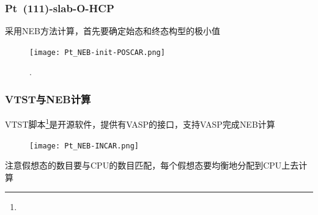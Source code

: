 \frame
{
	\frametitle{\textrm{Pt~(111)-slab-O-HCP}}
采用\textrm{NEB}方法计算，首先要确定始态和终态构型的极小值%
\begin{figure}[h!]
	\vskip -5pt
\centering
\texttt{[image: Pt\_NEB-init-POSCAR.png]}
\caption{\fontsize{6.2pt}{5.2pt}.}%
\label{Pt_NEB-init-POSCAR}
\end{figure}
{\fontsize{7.2pt}{5.2pt}}
}

\frame
{
	\frametitle{\textrm{VTST}与\textrm{NEB}计算}
	\textrm{VTST}脚本\footnote{\fontsize{6.2pt}{5.2pt}}是开源软件，提供有\textrm{VASP}的接口，支持\textrm{VASP}完成\textrm{NEB}计算%
\begin{figure}[h!]
\centering
\texttt{[image: Pt\_NEB-INCAR.png]}
\caption{\fontsize{6.2pt}{5.2pt}}%
\label{Pt_NEB-INCAR}
\end{figure}
注意假想态的数目要与\textrm{CPU}的数目匹配，每个假想态要均衡地分配到\textrm{CPU}上去计算%
}

